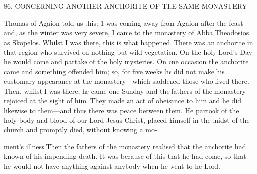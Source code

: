 86. CONCERNING ANOTHER ANCHORITE
OF THE SAME MONASTERY

Thomas of Agaion told us this: 1 was coming away from Agaion
after the feast and, as the winter was very severe, I came to the
monastery of Abba Theodosios as Skopelos. Whilst I was there, this
is what happened. There was an anchorite in that region who
survived on nothing but wild vegetation. On the holy Lord's Day he
would come and partake of the holy mysteries. On one occasion the
anchorite came and something offended him; so, for five weeks he
did not make his customary appearance at the monastery—which
saddened those who lived there. Then, whilst I was there, he came
one Sunday and the fathers of the monastery rejoiced at the sight of
him. They made an act of obeisance to him and he did likewise to
them—and thus there was peace between them. He partook of the
holy body and blood of our Lord Jesus Christ, placed himself in the
midst of the church and promptly died, without knowing a mo-

ment's illness.Then the fathers of the monastery realised that the
anchorite had known of his impending death. It was because of this
that he had come, so that he would not have anything against
anybody when he went to he Lord.

